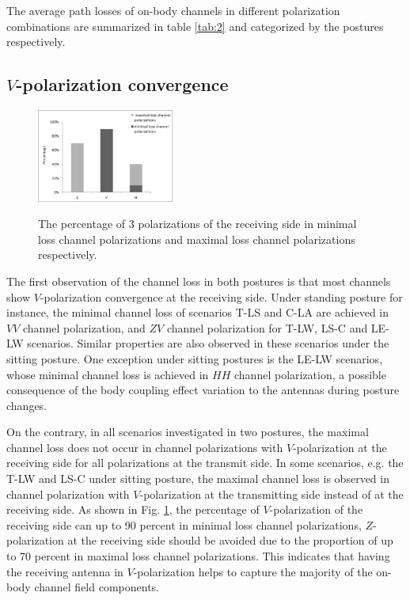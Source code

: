 \documentclass[conference]{IEEEtran}
\begin{document}
The average path losses of on-body channels in different polarization combinations are summarized in table \ref{tab:2} and categorized by the postures respectively.

\subsection{$V$-polarization convergence}

\begin{figure}[!t]
  \centering
  \includegraphics[width=0.4\textwidth]{figs/6.eps}\\
  \caption{The percentage of 3 polarizations of the receiving side in minimal loss channel polarizations and maximal loss channel polarizations respectively.}
  \label{fig:polarization percentage}
\end{figure}

The first observation of the channel loss in both postures is that most channels show $V$-polarization convergence at the receiving side. Under standing posture for instance, the minimal channel loss of scenarios T-LS and C-LA are achieved in $VV$ channel polarization, and $ZV$ channel polarization for T-LW, LS-C and LE-LW scenarios. Similar properties are also observed in these scenarios under the sitting posture. One exception under sitting postures is the LE-LW scenarios, whose minimal channel loss is achieved in $HH$ channel polarization, a possible consequence of the body coupling effect variation to the antennas during posture changes.

On the contrary, in all scenarios investigated in two postures, the maximal channel loss does not occur in channel polarizations with $V$-polarization at the receiving side for all polarizations at the transmit side.  In some scenarios, e.g. the T-LW and LS-C under sitting posture, the maximal channel loss is observed in channel polarization with $V$-polarization at the transmitting side instead of at the receiving side. As shown in Fig. \ref{fig:polarization percentage}, the percentage of $V$-polarization of the receiving side can up to 90 percent in minimal loss channel polarizations, $Z$-polarization at the receiving side should be avoided due to the proportion of up to 70 percent in maximal loss channel polarizations. This indicates that having the receiving antenna in $V$-polarization helps to capture the majority of the on-body channel field components.
\end{document}

